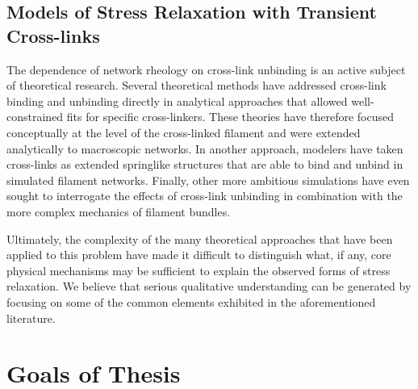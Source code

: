\subsection{Models of Stress Relaxation with Transient Cross-links}

The dependence of network rheology on cross-link unbinding is an active subject of theoretical research\cite{theo_crosslinkslip2}.  Several theoretical methods have addressed cross-link binding and unbinding directly \cite{theo_crosslinkslip1,theo_crosslinkslip2} in analytical approaches that allowed well-constrained fits for specific cross-linkers.  These theories have therefore focused conceptually at the level of the cross-linked filament and were extended analytically to macroscopic networks.  In another approach, modelers have taken cross-links as extended springlike structures \cite{model_taeyoon} that are able to bind and unbind in simulated filament networks. Finally, other more ambitious simulations have even sought to interrogate the effects of cross-link unbinding in combination with the more complex mechanics of filament bundles\cite{rheo_crosslinkslip2,theo_crosslinkslip3}.

Ultimately, the complexity of the many theoretical approaches that have been applied to this problem have made it difficult to distinguish what, if any, core physical mechanisms may be sufficient to explain the observed forms of stress relaxation.  We believe that serious qualitative understanding can be generated by focusing on some of the common elements exhibited in the aforementioned literature.






\section{Goals of Thesis}

